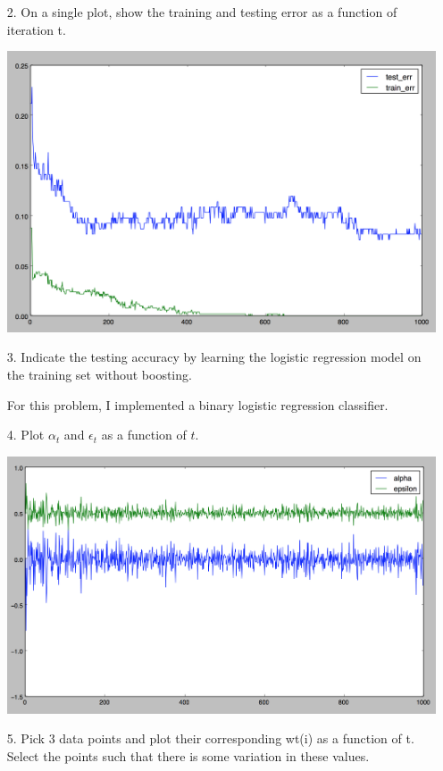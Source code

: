 \documentclass[11pt]{article}
\begin{document}
\begin{enumerate}
\item [2.] On a single plot, show the training and testing error as a function of iteration t.

\includegraphics[scale=.5]{images/p3testtrain.png}

\item[3.] Indicate the testing accuracy by learning the logistic regression model on the training set without boosting.

For this problem, I implemented a binary logistic regression classifier.

\item[4.] Plot $\alpha_t$ and $\epsilon_t$ as a function of $t$.

\includegraphics[scale=.5]{images/p3params.png}

\item[5.] Pick 3 data points and plot their corresponding wt(i) as a function of t. Select the points such that there is some variation in these values.


\end{enumerate}
\end{document}
